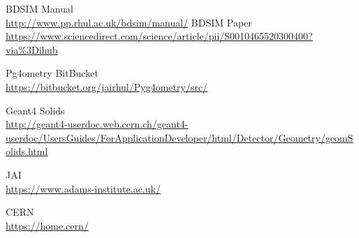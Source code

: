 \documentclass[12pt,a4paper]{article}
\begin{document}
\small




\newpage
\begin{thebibliography}{1}
	\bibitem{}
		BDSIM Manual\\
		\url{http://www.pp.rhul.ac.uk/bdsim/manual/}
	\bibitem{}
		BDSIM Paper\\
		\url{https://www.sciencedirect.com/science/article/pii/S0010465520300400?via%3Dihub}
		
		
	\bibitem{}
		Pg4ometry BitBucket\\
		\url{https://bitbucket.org/jairhul/Pyg4ometry/src/}
		
	\bibitem{}
	Geant4 Solids\\
	\url{http://geant4-userdoc.web.cern.ch/geant4-userdoc/UsersGuides/ForApplicationDeveloper/html/Detector/Geometry/geomSolids.html}
	
	JAI\\
	\url{https://www.adams-institute.ac.uk/}
	
	CERN\\
	\url{https://home.cern/}
		
		

\end{thebibliography}
\end{document}
